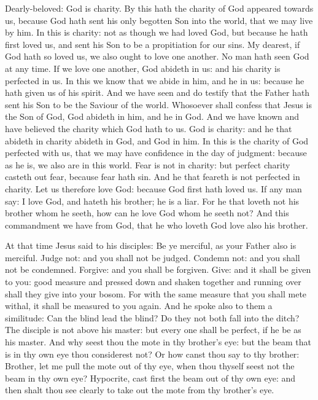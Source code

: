 \begin{multicols}{2}
Dearly-beloved: %
God is charity.  By this hath the
charity of God appeared towards us, because God hath sent his only begotten Son
into the world, that we may live by him.  In this is charity: not as though we
had loved God, but because he hath first loved us, and sent his Son to be a
propitiation for our sins.  My dearest, if God hath so loved us, we also ought
to love one another.  No man hath seen God at any time. If we love one another,
God abideth in us: and his charity is perfected in us.  In this we know that we
abide in him, and he in us: because he hath given us of his spirit.  And we
have seen and do testify that the Father hath sent his Son to be the Saviour of
the world.  Whosoever shall confess that Jesus is the Son of God, God abideth
in him, and he in God.  And we have known and have believed the charity which
God hath to us. God is charity: and he that abideth in charity abideth in God,
and God in him.  In this is the charity of God perfected with us, that we may
have confidence in the day of judgment: because as he is, we also are in this
world.  Fear is not in charity: but perfect charity casteth out fear, because
fear hath sin. And he that feareth is not perfected in charity.
 Let us therefore love God: because God
first hath loved us.  If any man say: I love God, and hateth his brother; he is
a liar.  For he that loveth not his brother whom he seeth, how can he love God
whom he seeth not?  And this commandment we have from God, that he who loveth
God love also his brother.



At that time Jesus said to his disciples:
Be ye merciful, as your Father also is merciful.  Judge not: and you
shall not be judged. Condemn not: and you shall not be condemned. Forgive: and
you shall be forgiven.  Give: and it shall be given to you: good measure and
pressed down and shaken together and running over shall they give into your
bosom.  For with the same measure that you shall mete withal, it shall be
measured to you again.  And he spoke also to them a similitude: Can the blind
lead the blind? Do they not both fall into the ditch?  The disciple is not
above his master: but every one shall be perfect, if he be as his master.  And
why seest thou the mote in thy brother's eye: but the beam that is in thy own
eye thou considerest not?  Or how canst thou say to thy brother: Brother, let
me pull the mote out of thy eye, when thou thyself seest not the beam in thy
own eye? Hypocrite, cast first the beam out of thy own eye: and then shalt thou
see clearly to take out the mote from thy brother's eye.



\end{multicols}
